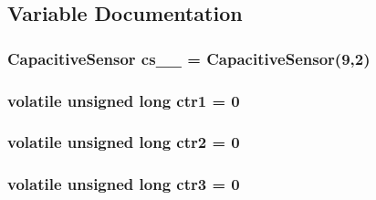 \subsection{Variable Documentation}
\hypertarget{OWGeneric__DangerShield_8ino_af6f50cfb8376b0de0f518da1b7d1b2f8}{
\subsubsection[{cs\-\_\-9\-\_\-2}]{\setlength{\rightskip}{0pt plus 5cm}Capacitive\-Sensor cs\-\_\-\_ = Capacitive\-Sensor(9,2)}}\label{OWGeneric__DangerShield_8ino_af6f50cfb8376b0de0f518da1b7d1b2f8}
\hypertarget{OWGeneric__DangerShield_8ino_a68c3f19187ae81a2c190ec87b5874dd3}{
\subsubsection[{ctr1}]{\setlength{\rightskip}{0pt plus 5cm}volatile unsigned long ctr1 = 0}}\label{OWGeneric__DangerShield_8ino_a68c3f19187ae81a2c190ec87b5874dd3}
\hypertarget{OWGeneric__DangerShield_8ino_ab93a6d1ba9d998ab5d4f846e8cea0149}{
\subsubsection[{ctr2}]{\setlength{\rightskip}{0pt plus 5cm}volatile unsigned long ctr2 = 0}}\label{OWGeneric__DangerShield_8ino_ab93a6d1ba9d998ab5d4f846e8cea0149}
\hypertarget{OWGeneric__DangerShield_8ino_a9edb10c1b079b5c8e77748ca203036eb}{
\subsubsection[{ctr3}]{\setlength{\rightskip}{0pt plus 5cm}volatile unsigned long ctr3 = 0}}\label{OWGeneric__DangerShield_8ino_a9edb10c1b079b5c8e77748ca203036eb}
